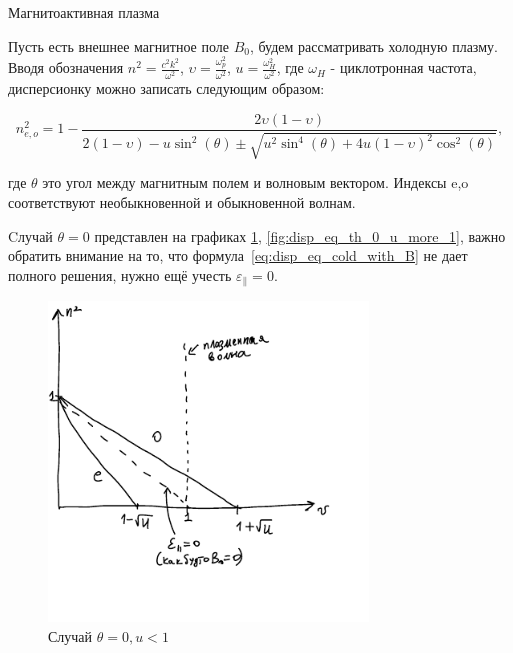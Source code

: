\documentclass[10pt, a4paper]{article}
\begin{document}
Магнитоактивная плазма

Пусть есть внешнее магнитное поле $B_0$, будем рассматривать холодную плазму. Вводя обозначения $n^2=\frac{c^2 k^2}{\omega^2}$, $\upsilon=\frac{\omega_p^2}{\omega^2}$, $u=\frac{\omega_H^2}{\omega^2}$, где $\omega_H$ - циклотронная частота, дисперсионку можно записать следующим образом:

\begin{equation}
    \label{eq:disp_eq_cold_with_B}
    n_{e,o}^2=1-\frac{2\upsilon (1-\upsilon)}{2(1-\upsilon) - u \sin^2(\theta) \pm \sqrt{u^2 \sin^4(\theta) + 4u(1-\upsilon)^2 \cos^2(\theta)}}, 
\end{equation}

где $\theta$ это угол между магнитным полем и волновым вектором. Индексы e,o соответствуют необыкновенной и обыкновенной волнам.

Cлучай $\theta=0$ представлен на графиках \ref{fig:disp_eq_th_0_u_less_1}, \ref{fig:disp_eq_th_0_u_more_1}, важно обратить внимание на то, что формула~\ref{eq:disp_eq_cold_with_B} не дает полного решения, нужно ещё учесть $\varepsilon_{\parallel}=0$.

\begin{figure}[h!]
	\begin{center}
		\includegraphics[width=85mm]{theta0-u-less-1.pdf}
	\end{center}
	\caption{Случай $\theta=0, u < 1$}
	\label{fig:disp_eq_th_0_u_less_1}
\end{figure}
\end{document}
